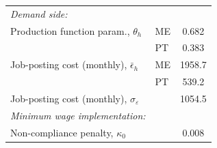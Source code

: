 \begin{tabular}{llc}
  \textit{Demand side:}  &     &   \\ 
Production function param., $\theta_h$  &ME &       0.682 \\
										 &PT &       0.383 \\
Job-posting cost  (monthly), $\bar{\epsilon}_h  $ &ME &      1958.7 \\
										 &PT &       539.2 \\
Job-posting cost (monthly), $\sigma_\varepsilon  $   & &      1054.5 \\
  \textit{Minimum wage implementation:}  &     &   \\ 
Non-compliance penalty, $\kappa_0$  & &       0.008 \\
\hline\hline 
\end{tabular} 
